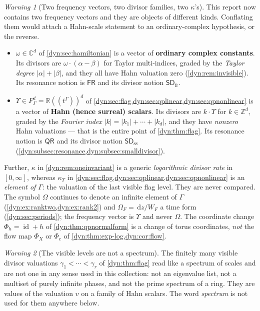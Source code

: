 \documentclass[11pt,letterpaper]{article}
\theoremstyle{definition}
\theoremstyle{remark}
\newtheorem{warning}[warning]{Warning}
\newcommand{\C}{\mathbb C}
\newcommand{\R}{\mathbb R}
\newcommand{\Z}{\mathbb Z}
\newcommand{\id}{\operatorname{id}}
\newcommand{\dd}{\,\mathrm d}
\newcommand{\sdfr}{\mathsf{SD}_{\mathrm{fr}}}
\newcommand{\fres}{\mathsf{FR}}
\newcommand{\qres}{\mathsf{QR}}
\newcommand{\sdss}{\mathsf{SD}_{\mathrm{ss}}}
\newcommand{\kups}{\kappa_{\Upsilon}}
\numberwithin{equation}{section}
\begin{document}
\begin{warning}[Two frequency vectors, two divisor families, two $\kappa$'s]
\label{dyn:warn:twofrequencies}
This report now contains two frequency vectors and they are objects of
different kinds. Conflating them would attach a Hahn-scale statement to an
ordinary-complex hypothesis, or the reverse.
\begin{itemize}
\item $\omega\in\C^{d}$ of \cref{dyn:sec:hamiltonian} is a vector of
\textbf{ordinary complex constants}. Its divisors are
$\omega\cdot(\alpha-\beta)$ for Taylor multi-indices, graded by the
\emph{Taylor degree} $|\alpha|+|\beta|$, and they all have Hahn valuation
zero (\cref{dyn:rem:invisible}). Its resonance notion is $\fres$ and its
divisor notion $\sdfr$.
\item $\Upsilon\in F_\Gamma^{d}=\R((t^{\Gamma}))^{d}$ of
\cref{dyn:sec:flag,dyn:sec:qplinear,dyn:sec:qpnonlinear} is a
vector of \textbf{Hahn (hence surreal) scalars}. Its divisors are
$k\cdot\Upsilon$ for $k\in\Z^{d}$, graded by the \emph{Fourier index}
$|k|=|k_1|+\cdots+|k_d|$, and they have \emph{nonzero} Hahn valuations ---
that is the entire point of \cref{dyn:thm:flag}. Its resonance notion is
$\qres$ and its divisor notion $\sdss$
(\cref{dyn:subsec:resonance,dyn:subsec:smalldivisor}).
\end{itemize}
Further, $\kappa$ in \cref{dyn:rem:oneinvariant} is a generic
\emph{logarithmic divisor rate} in $[0,\infty]$, whereas $\kups$ in
\cref{dyn:sec:flag,dyn:sec:qplinear,dyn:sec:qpnonlinear} is an
\emph{element of $\Gamma$}: the valuation of the last visible flag level. They are never compared. The symbol $\Omega$ continues to
denote an infinite element of $\Gamma$
(\cref{dyn:ex:ranktwo,dyn:ex:rank2}) and $\Omega_F=\dd z/W_F$ a time form
(\cref{dyn:sec:periods}); the frequency vector is $\Upsilon$ and never
$\Omega$. The coordinate change $\Phi_h=\id+h$ of
\cref{dyn:thm:qpnormalform} is a change of torus coordinates, \emph{not}
the flow map $\Phi_X$ or $\Phi_c$ of \cref{dyn:thm:exp-log,dyn:cor:flow}.
\end{warning}

\begin{warning}[The visible levels are not a spectrum]
\label{dyn:warn:qpspectrum}
The finitely many visible divisor valuations $\gamma_1<\cdots<\gamma_r$ of
\cref{dyn:thm:flag} read like a spectrum of scales and are not one in any
sense used in this collection: not an eigenvalue list, not a multiset of
purely infinite phases, and not the prime spectrum of a ring. They are
values of the valuation $v$ on a family of Hahn scalars. The word
\emph{spectrum} is not used for them anywhere below.
\end{warning}
\end{document}
